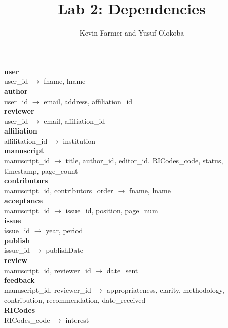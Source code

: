 \documentclass{article}
\title{Lab 2: Dependencies}
\author{Kevin Farmer and Yusuf Olokoba}
\newcommand{\ra}{$\rightarrow$ }
\begin{document}
\maketitle


\textbf{user} \\
user\_id \ra fname, lname \\

\textbf{author} \\
user\_id \ra email, address, affiliation\_id \\

\textbf{reviewer} \\
user\_id \ra email, affiliation\_id \\

\textbf{affiliation} \\
affilitation\_id \ra institution \\

\textbf{manuscript} \\
manuscript\_id \ra title, author\_id, editor\_id, RICodes\_code, status, timestamp, page\_count \\

\textbf{contributors} \\
manuscript\_id, contributors\_order \ra fname, lname \\

\textbf{acceptance} \\
manuscript\_id \ra issue\_id, position, page\_num \\

\textbf{issue} \\
issue\_id \ra year, period \\

\textbf{publish} \\
issue\_id \ra publishDate \\

\textbf{review} \\
manuscript\_id, reviewer\_id \ra date\_sent \\

\textbf{feedback} \\
manuscript\_id, reviewer\_id \ra appropriateness, clarity, methodology, contribution, recommendation, date\_received \\

\textbf{RICodes} \\
RICodes\_code \ra interest \\
\end{document}
